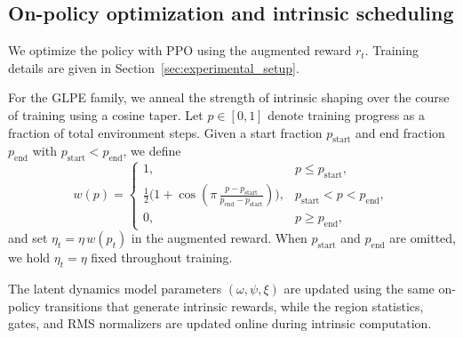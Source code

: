 \subsection{On-policy optimization and intrinsic scheduling}

We optimize the policy with PPO using the augmented reward $r_t$.
Training details are given in Section~\ref{sec:experimental_setup}.

For the GLPE family, we anneal the strength of intrinsic shaping over the course of training using a cosine taper.
Let $p\in[0,1]$ denote training progress as a fraction of total environment steps.
Given a start fraction $p_{\mathrm{start}}$ and end fraction $p_{\mathrm{end}}$ with $p_{\mathrm{start}}<p_{\mathrm{end}}$, we define
\begin{equation}
    w(p) =
    \begin{cases}
        1, & p \le p_{\mathrm{start}},\\
        \tfrac{1}{2}\big(1+\cos(\pi\,\tfrac{p-p_{\mathrm{start}}}{p_{\mathrm{end}}-p_{\mathrm{start}}})\big), & p_{\mathrm{start}}<p<p_{\mathrm{end}},\\
        0, & p \ge p_{\mathrm{end}},
    \end{cases}
\end{equation}
and set $\eta_t=\eta\,w(p_t)$ in the augmented reward.
When $p_{\mathrm{start}}$ and $p_{\mathrm{end}}$ are omitted, we hold $\eta_t=\eta$ fixed throughout training.

The latent dynamics model parameters $(\omega,\psi,\xi)$ are updated using the same on-policy transitions that generate intrinsic rewards, while the region statistics, gates, and RMS normalizers are updated online during intrinsic computation.



